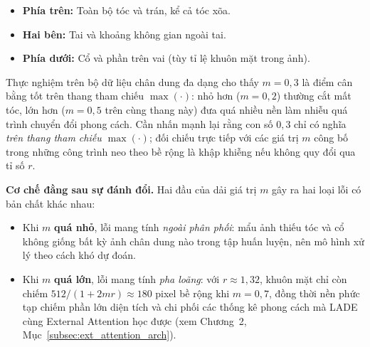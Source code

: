 \begin{itemize}
    \item \textbf{Phía trên:} Toàn bộ tóc và trán, kể cả tóc xõa.
    \item \textbf{Hai bên:} Tai và khoảng không gian ngoài tai.
    \item \textbf{Phía dưới:} Cổ và phần trên vai (tùy tỉ lệ khuôn mặt trong ảnh).
\end{itemize}

Thực nghiệm trên bộ dữ liệu chân dung đa dạng cho thấy $m = 0{,}3$ là điểm cân bằng tốt trên thang tham chiếu $\max(\cdot)$: nhỏ hơn ($m = 0{,}2$) thường cắt mất tóc, lớn hơn ($m = 0{,}5$ trên cùng thang này) đưa quá nhiều nền làm nhiễu quá trình chuyển đổi phong cách. Cần nhấn mạnh lại rằng con số $0{,}3$ chỉ có nghĩa \textit{trên thang tham chiếu $\max(\cdot)$}; đối chiếu trực tiếp với các giá trị $m$ công bố trong những công trình neo theo bề rộng là khập khiễng nếu không quy đổi qua tỉ số $r$.

\textbf{Cơ chế đằng sau sự đánh đổi.} Hai đầu của dải giá trị $m$ gây ra hai loại lỗi có bản chất khác nhau:
\begin{itemize}
    \item Khi $m$ \textbf{quá nhỏ}, lỗi mang tính \textit{ngoài phân phối}: mẩu ảnh thiếu tóc và cổ không giống bất kỳ ảnh chân dung nào trong tập huấn luyện, nên mô hình xử lý theo cách khó dự đoán.
    \item Khi $m$ \textbf{quá lớn}, lỗi mang tính \textit{pha loãng}: với $r \approx 1{,}32$, khuôn mặt chỉ còn chiếm $512/(1 + 2mr) \approx 180$ pixel bề rộng khi $m = 0{,}7$, đồng thời nền phức tạp chiếm phần lớn diện tích và chi phối các thống kê phong cách mà LADE cùng External Attention học được (xem Chương~2, Mục~\ref{subsec:ext_attention_arch}).
\end{itemize}


